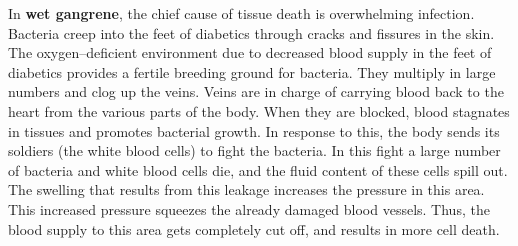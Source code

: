 In \textbf{wet gangrene}, the chief cause of tissue death is overwhel\-ming infection. Bacteria creep into the feet of diabetics through cracks and fissures in the skin. The oxygen–deficient environment due to decrea\-sed blood supply in the feet of diabetics provides a fertile breeding ground for bacteria. They multiply in large numbers and clog up the veins. Veins are in charge of carrying blood back to the heart from the various parts of the body. When they are blocked, blood stagnates in tissues and promotes bacterial growth. In response to this, the body sends its soldiers (the white blood cells) to fight the bacteria. In this fight a large number of bacteria and white blood cells die, and the fluid content of these cells spill out. The swelling that results from this leakage increases the pressure in this area. This increased pressure squeezes the already damaged blood vessels. Thus, the blood supply to this area gets completely cut off, and results in more cell death.

